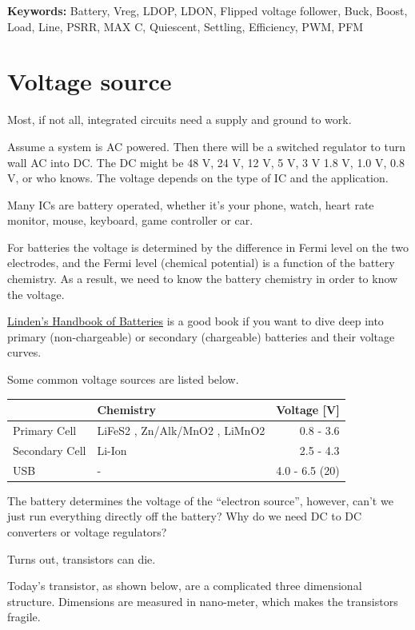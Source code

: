 \textbf{Keywords:} Battery, Vreg, LDOP, LDON, Flipped voltage follower,
Buck, Boost, Load, Line, PSRR, MAX C, Quiescent, Settling, Efficiency,
PWM, PFM

\section{Voltage source}\label{voltage-source}

Most, if not all, integrated circuits need a supply and ground to work.

Assume a system is AC powered. Then there will be a switched regulator
to turn wall AC into DC. The DC might be 48 V, 24 V, 12 V, 5 V, 3 V 1.8
V, 1.0 V, 0.8 V, or who knows. The voltage depends on the type of IC and
the application.

Many ICs are battery operated, whether it's your phone, watch, heart
rate monitor, mouse, keyboard, game controller or car.

For batteries the voltage is determined by the difference in Fermi level
on the two electrodes, and the Fermi level (chemical potential) is a
function of the battery chemistry. As a result, we need to know the
battery chemistry in order to know the voltage.

\href{https://www.amazon.com/Lindens-Handbook-Batteries-Fifth-Kirby/dp/1260115925}{Linden's
Handbook of Batteries} is a good book if you want to dive deep into
primary (non-chargeable) or secondary (chargeable) batteries and their
voltage curves.

Some common voltage sources are listed below.

\begin{longtable}[]{@{}llr@{}}
\toprule\noalign{}
& Chemistry & Voltage {[}V{]} \\
\midrule\noalign{}
\endhead
\bottomrule\noalign{}
\endlastfoot
Primary Cell & LiFeS2 , Zn/Alk/MnO2 , LiMnO2 & 0.8 - 3.6 \\
Secondary Cell & Li-Ion & 2.5 - 4.3 \\
USB & - & 4.0 - 6.5 (20) \\
\end{longtable}

The battery determines the voltage of the ``electron source'', however,
can't we just run everything directly off the battery? Why do we need DC
to DC converters or voltage regulators?

Turns out, transistors can die.

Today's transistor, as shown below, are a complicated three dimensional
structure. Dimensions are measured in nano-meter, which makes the
transistors fragile.

